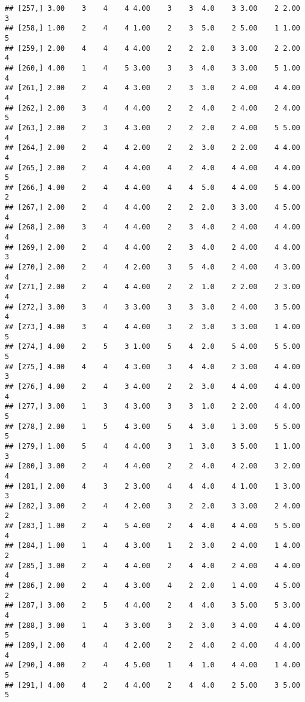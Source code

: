 \documentclass[]{article}
\begin{document}
\begin{verbatim}
## [257,] 3.00    3    4    4 4.00    3    3  4.0    3 3.00    2 2.00    3
## [258,] 1.00    2    4    4 1.00    2    3  5.0    2 5.00    1 1.00    5
## [259,] 2.00    4    4    4 4.00    2    2  2.0    3 3.00    2 2.00    4
## [260,] 4.00    1    4    5 3.00    3    3  4.0    3 3.00    5 1.00    4
## [261,] 2.00    2    4    4 3.00    2    3  3.0    2 4.00    4 4.00    4
## [262,] 2.00    3    4    4 4.00    2    2  4.0    2 4.00    2 4.00    5
## [263,] 2.00    2    3    4 3.00    2    2  2.0    2 4.00    5 5.00    4
## [264,] 2.00    2    4    4 2.00    2    2  3.0    2 2.00    4 4.00    4
## [265,] 2.00    2    4    4 4.00    4    2  4.0    4 4.00    4 4.00    5
## [266,] 4.00    2    4    4 4.00    4    4  5.0    4 4.00    5 4.00    2
## [267,] 2.00    2    4    4 4.00    2    2  2.0    3 3.00    4 5.00    4
## [268,] 2.00    3    4    4 4.00    2    3  4.0    2 4.00    4 4.00    4
## [269,] 2.00    2    4    4 4.00    2    3  4.0    2 4.00    4 4.00    3
## [270,] 2.00    2    4    4 2.00    3    5  4.0    2 4.00    4 3.00    4
## [271,] 2.00    2    4    4 4.00    2    2  1.0    2 2.00    2 3.00    4
## [272,] 3.00    3    4    3 3.00    3    3  3.0    2 4.00    3 5.00    4
## [273,] 4.00    3    4    4 4.00    3    2  3.0    3 3.00    1 4.00    5
## [274,] 4.00    2    5    3 1.00    5    4  2.0    5 4.00    5 5.00    5
## [275,] 4.00    4    4    4 3.00    3    4  4.0    2 3.00    4 4.00    3
## [276,] 4.00    2    4    3 4.00    2    2  3.0    4 4.00    4 4.00    4
## [277,] 3.00    1    3    4 3.00    3    3  1.0    2 2.00    4 4.00    5
## [278,] 2.00    1    5    4 3.00    5    4  3.0    1 3.00    5 5.00    5
## [279,] 1.00    5    4    4 4.00    3    1  3.0    3 5.00    1 1.00    3
## [280,] 3.00    2    4    4 4.00    2    2  4.0    4 2.00    3 2.00    4
## [281,] 2.00    4    3    2 3.00    4    4  4.0    4 1.00    1 3.00    3
## [282,] 3.00    2    4    4 2.00    3    2  2.0    3 3.00    2 4.00    2
## [283,] 1.00    2    4    5 4.00    2    4  4.0    4 4.00    5 5.00    4
## [284,] 1.00    1    4    4 3.00    1    2  3.0    2 4.00    1 4.00    2
## [285,] 3.00    2    4    4 4.00    2    4  4.0    2 4.00    4 4.00    4
## [286,] 2.00    2    4    4 3.00    4    2  2.0    1 4.00    4 5.00    2
## [287,] 3.00    2    5    4 4.00    2    4  4.0    3 5.00    5 3.00    4
## [288,] 3.00    1    4    3 3.00    3    2  3.0    3 4.00    4 4.00    5
## [289,] 2.00    4    4    4 2.00    2    2  4.0    2 4.00    4 4.00    4
## [290,] 4.00    2    4    4 5.00    1    4  1.0    4 4.00    1 4.00    5
## [291,] 4.00    4    2    4 4.00    2    4  4.0    2 5.00    3 5.00    5

\end{verbatim}
\end{document}
